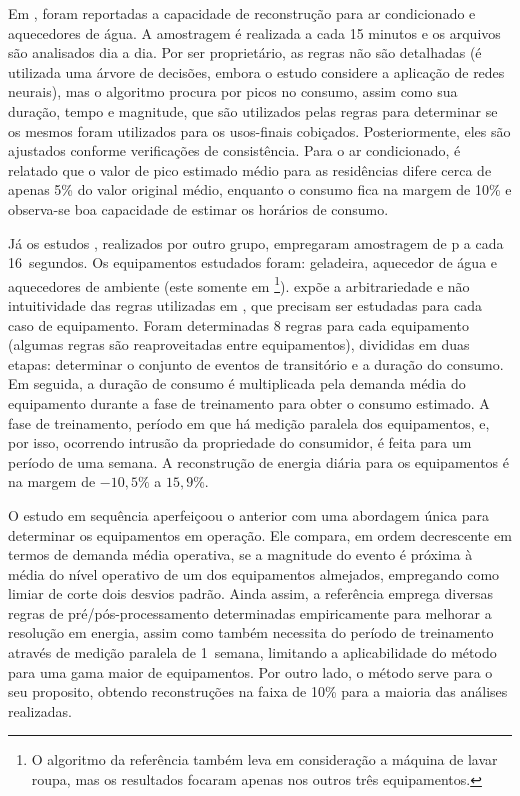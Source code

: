 \begin{enumerate}[label=\textbf{1.\arabic*},wide=\parindent]
\begin{enumerate}[label*=.\textbf{\arabic*},wide=\parindent]
Em \cite{nilm_powers_15minsamp_1991_16}, foram reportadas a capacidade
de reconstrução para ar condicionado e aquecedores de água. A
amostragem é realizada a cada 15 minutos e os arquivos são analisados
dia a dia. Por ser proprietário, as regras não são detalhadas (é
utilizada uma árvore de decisões, embora o estudo considere a aplicação
de redes neurais), mas o algoritmo procura por picos no consumo, assim
como sua duração, tempo e magnitude, que são utilizados pelas regras
para determinar se os mesmos foram utilizados para os usos-finais
cobiçados. Posteriormente, eles são ajustados conforme
verificações de consistência. Para o ar condicionado, é relatado que o
valor de pico estimado médio para as residências difere cerca de
apenas 5\% do valor original médio, enquanto o consumo fica na margem
de 10\% e observa-se boa capacidade de estimar os horários de consumo.
 
Já os estudos \cite{nilm_farinaccio_16ssamp_1999_17,
nilm_marceau_16ssamp_improved_1999_18}, realizados por outro
grupo, empregaram amostragem de \acs{p} a cada 16~segundos. Os
equipamentos estudados foram: geladeira, aquecedor de água e aquecedores
de ambiente (este somente em
\cite{nilm_marceau_16ssamp_improved_1999_18}\footnote{O algoritmo da
referência \cite{nilm_marceau_16ssamp_improved_1999_18}
também leva em consideração a máquina de lavar roupa, mas os
resultados focaram apenas nos outros três equipamentos.}).
\cite{nilm_zeifman_review_2011} expõe a arbitrariedade e não
intuitividade das regras utilizadas em
\cite{nilm_farinaccio_16ssamp_1999_17}, que precisam ser estudadas
para cada caso de equipamento. Foram determinadas 8 regras para cada
equipamento (algumas regras são reaproveitadas entre equipamentos),
divididas em duas etapas: determinar o conjunto de eventos de
transitório e a duração do consumo.  Em seguida, a duração de consumo é
multiplicada pela demanda média do equipamento durante a fase de
treinamento para obter o consumo estimado. A fase de treinamento,
período em que há medição paralela dos equipamentos, e, por isso,
ocorrendo intrusão da propriedade do consumidor, é feita para um
período de uma semana. A reconstrução de energia diária para os
equipamentos é na margem de $-10,5\%$ a $15,9\%$.

O estudo em sequência aperfeiçoou o anterior com uma abordagem única
para determinar os equipamentos em operação. Ele compara, em ordem
decrescente em termos de demanda média operativa, se a magnitude
do evento é próxima à média do nível operativo de um dos equipamentos
almejados, empregando como limiar de corte dois desvios padrão. Ainda
assim, a referência emprega diversas regras de pré/pós-processamento
determinadas empiricamente para melhorar a resolução em energia, assim
como também necessita do período de treinamento através de medição
paralela de 1~semana, limitando a aplicabilidade do método para uma
gama maior de equipamentos. Por outro lado, o método serve para o seu
proposito, obtendo reconstruções na faixa de 10\% para a maioria das
análises realizadas.


\end{enumerate}
\end{enumerate}
